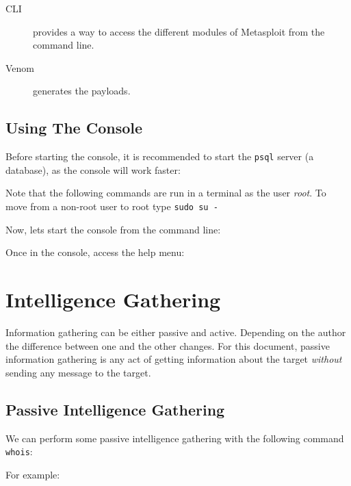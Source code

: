 \begin{description}
    \item[CLI] provides a way to access the different modules of Metasploit from the command line.
    \item[Venom] generates the payloads.
\end{description}

\subsection{Using The Console}
Before starting the console, it is recommended to start the \texttt{psql} server (a database), as the console will work faster:

\begin{warnbox}[frametitle=Warning: Running Metasploit as root user]
    Note that the following commands are run in a terminal as the user \textit{root}. To move from a non-root user to root type \texttt{sudo su -}
\end{warnbox}

\vspace{-1em}


Now, lets start the console from the command line:


Once in the console, access the help menu:


\section{Intelligence Gathering}
Information gathering can be either passive and active. Depending on the author the difference between one and the other changes. For this document, passive information gathering is any act of getting information about the target \textit{without} sending any message to the target.

\subsection{Passive Intelligence Gathering}

We can perform some passive intelligence gathering with the following command \texttt{whois}:


For example:

